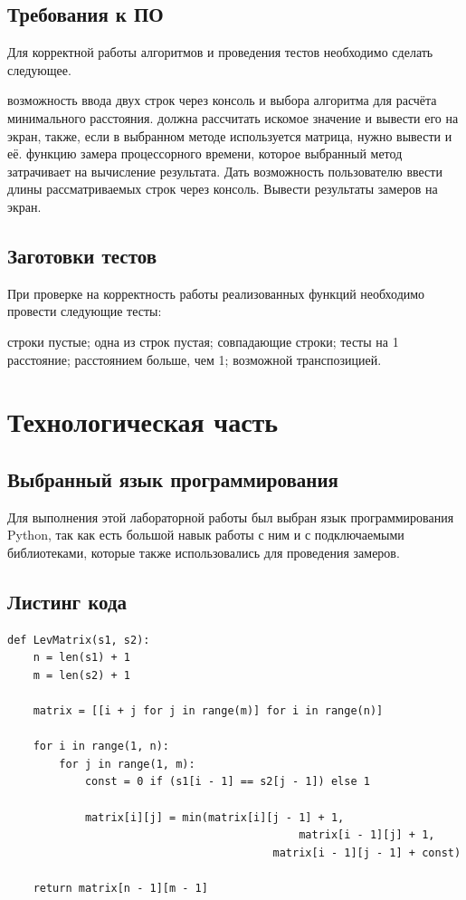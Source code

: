 \documentclass[12pt]{report}
\begin{document}
\section{Требования к ПО}
Для корректной работы алгоритмов и проведения тестов необходимо сделать следующее.
\begin{enumerate}
	 возможность ввода двух строк через консоль и выбора алгоритма для расчёта минимального расстояния.
	 должна рассчитать искомое значение и вывести его на экран, также, если в выбранном методе используется матрица, нужно вывести и её.
	 функцию замера процессорного времени, которое выбранный метод затрачивает на вычисление результата. Дать возможность пользователю ввести длины рассматриваемых строк через консоль. Вывести результаты замеров на экран.
	\end{enumerate}

\section{Заготовки тестов}
При проверке на корректность работы реализованных функций необходимо провести следующие тесты:
\begin{enumerate}
	 строки пустые;
	 одна из строк пустая;
	 совпадающие строки;
	 тесты на 1 расстояние;
	 расстоянием больше, чем 1;
	 возможной транспозицией.
\end{enumerate}

\chapter{Технологическая часть}
\section{Выбранный язык программирования}
Для выполнения этой лабораторной работы был выбран язык программирования Python, так как есть большой навык работы с ним и с подключаемыми библиотеками, которые также использовались для проведения замеров.
\section{Листинг кода}
\begin{lstlisting}[label=some-code, caption = Матричный алгоритм нахождения расстояния Левенштейна]
def LevMatrix(s1, s2):
	n = len(s1) + 1
	m = len(s2) + 1
	
	matrix = [[i + j for j in range(m)] for i in range(n)]
	
	for i in range(1, n):
		for j in range(1, m):
			const = 0 if (s1[i - 1] == s2[j - 1]) else 1
	
			matrix[i][j] = min(matrix[i][j - 1] + 1,
							   				 matrix[i - 1][j] + 1,
		 	  				   			 matrix[i - 1][j - 1] + const)
	
	return matrix[n - 1][m - 1]
	
	\end{lstlisting}
\end{document}

